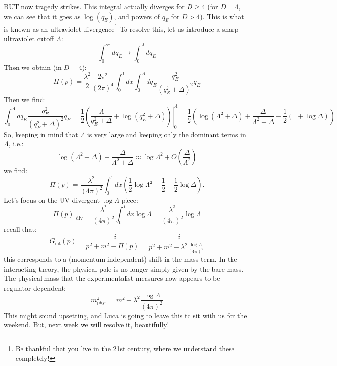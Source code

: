 BUT now tragedy strikes. This integral actually diverges for $D \geq 4$ (for $D = 4$, we can see that it goes as $\log(q_E)$, and powers of $q_E$ for $D >4$). This is what is known as an ultraviolet divergence\footnote{Be thankful that you live in the 21st century, where we understand these completely!} To resolve this, let us introduce a sharp ultraviolet cutoff $\Lambda$:
\begin{equation}
    \int_0^{\infty} dq_E \to \int_0^\Lambda dq_E
\end{equation}
Then we obtain (in $D = 4$):
\begin{equation}
    \Pi(p) = \frac{\lambda^2}{2}\frac{2\pi^2}{(2\pi)^4}\int_0^1 dx \int_0^\Lambda dq_E \frac{q_E^2}{(q_E^2 + \Delta)^2}q_E
\end{equation}
Then we find:
\begin{equation}
    \int_0^\Lambda dq_E \frac{q_E^2}{(q_E^2 + \Delta)^2}q_E = \left. \frac{1}{2}\left(\frac{\Lambda}{q_E^2 + \Delta} + \log(q_E^2 + \Delta)\right)\right|_{0}^\Lambda = \frac{1}{2}\left(\log(\Lambda^2 + \Delta) + \frac{\Delta}{\Lambda^2 + \Delta} - \frac{1}{2}(1 + \log \Delta)\right)
\end{equation}
So, keeping in mind that $\Lambda$ is very large and keeping only the dominant terms in $\Lambda$, i.e.:
\begin{equation}
    \log(\Lambda^2 + \Delta) + \frac{\Delta}{\Lambda^2 + \Delta} \approx \log\Lambda^2 + O(\frac{\Delta}{\Lambda^2})
\end{equation}
we find:
\begin{equation}
    \Pi(p) = \frac{\lambda^2}{(4\pi)^2}\int_0^1 dx \left(\frac{1}{2}\log\Lambda^2 - \frac{1}{2} - \frac{1}{2}\log\Delta\right).
\end{equation}
Let's focus on the UV divergent $\log \Lambda$ piece:
\begin{equation}
    \left.\Pi(p)\right|_{\text{div}} = \frac{\lambda^2}{(4\pi)^2}\int_0^1 dx \log\Lambda = \frac{\lambda^2}{(4\pi)^2}\log \Lambda
\end{equation}
recall that:
\begin{equation}
    G_{\text{int}}(p) = \frac{-i}{p^2 + m^2 - \Pi(p)} = \frac{-i}{p^2 + m^2 - \lambda^2\frac{\log \Lambda}{(4\pi)^2}}
\end{equation}
this corresponds to a (momentum-independent) shift in the mass term. In the interacting theory, the physical pole is no longer simply given by the bare mass. The physical mass that the experimentalist measures now appears to be regulator-dependent:
\begin{equation}
    m_{\text{phys}}^2 = m^2 -\lambda^2\frac{\log \Lambda}{(4\pi)^2}
\end{equation}
This might sound upsetting, and Luca is going to leave this to sit with us for the weekend. But, next week we will resolve it, beautifully!